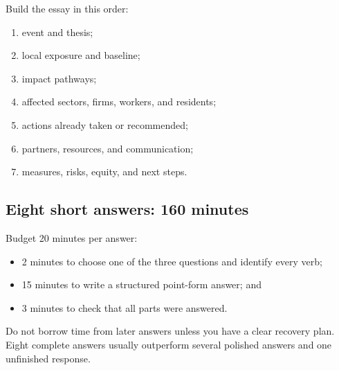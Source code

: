\documentclass[11pt,letterpaper,oneside,openany]{book}
\begin{document}
Build the essay in this order:


\begin{enumerate}
\item event and thesis;
\item local exposure and baseline;
\item impact pathways;
\item affected sectors, firms, workers, and residents;
\item actions already taken or recommended;
\item partners, resources, and communication;
\item measures, risks, equity, and next steps.
\end{enumerate}


\subsection[Eight short answers: 160 minutes]{Eight short answers: 160 minutes}
Budget 20 minutes per answer:


\begin{itemize}
\item 2 minutes to choose one of the three questions and identify every verb;
\item 15 minutes to write a structured point-form answer; and
\item 3 minutes to check that all parts were answered.
\end{itemize}


Do not borrow time from later answers unless you have a clear recovery plan. Eight complete answers usually outperform several polished answers and one unfinished response.


\end{document}
